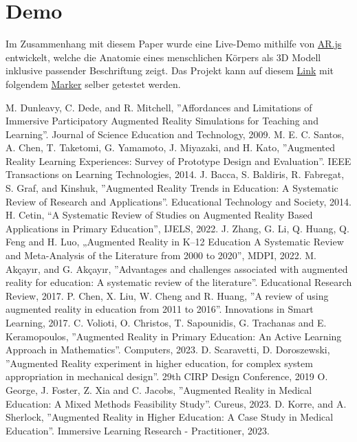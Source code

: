 \documentclass[conference]{IEEEtran}
\begin{document}
\section{Demo}
\label{demo}
Im Zusammenhang mit diesem Paper wurde eine Live-Demo mithilfe von \href{https://ar-js-org.github.io/AR.js-Docs/}{AR.js} entwickelt, welche die Anatomie eines menschlichen 
Körpers als 3D Modell inklusive passender Beschriftung zeigt. Das Projekt kann auf diesem \href{https://lydr.io/ar}{Link} mit folgendem \href{https://lydr.io/ar/hiro.png}{Marker} selber getestet werden.


\begin{thebibliography}{00}
      M. Dunleavy, C. Dede, and R. Mitchell, ''Affordances and Limitations of Immersive Participatory Augmented Reality Simulations for Teaching and Learning''. Journal of Science Education and Technology, 2009.
     M. E. C. Santos, A. Chen, T. Taketomi, G. Yamamoto, J. Miyazaki, and H. Kato, ''Augmented Reality Learning Experiences: Survey of Prototype
    Design and Evaluation''. IEEE Transactions on Learning Technologies, 2014.
     J. Bacca, S. Baldiris, R. Fabregat, S. Graf, and Kinshuk, ''Augmented Reality Trends in Education: A Systematic Review of Research and Applications''. Educational Technology and Society, 2014.
     H. Cetin, “A Systematic Review of Studies on Augmented Reality Based Applications in Primary Education”, IJELS, 2022.
     J. Zhang, G. Li, Q. Huang, Q. Feng and H. Luo, „Augmented Reality in K–12 Education A Systematic Review and Meta-Analysis of the Literature from 2000 to 2020”, MDPI, 2022.
     M. Akçayır, and G. Akçayır, ''Advantages and challenges associated with augmented reality for education: A systematic review of the literature''. Educational Research Review, 2017.
     P. Chen, X. Liu, W. Cheng and R. Huang, ''A review of using augmented reality in education from 2011 to 2016''. Innovations in Smart Learning, 2017.
     C. Volioti, O. Christos, T. Sapounidis, G. Trachanas and E. Keramopoulos, ''Augmented Reality in Primary Education: An Active Learning Approach in Mathematics''. Computers, 2023.
     D. Scaravetti, D. Doroszewski, ''Augmented Reality experiment in higher education, for complex system appropriation in mechanical design''. 29th CIRP Design Conference, 2019
     O. George, J. Foster, Z. Xia and C. Jacobs, ''Augmented Reality in Medical Education: A Mixed Methods Feasibility Study''. Cureus, 2023.
     D. Korre, and A. Sherlock, ''Augmented Reality in Higher Education: A Case Study in Medical Education''. Immersive Learning Research - Practitioner, 2023.

\end{thebibliography}
\end{document}
